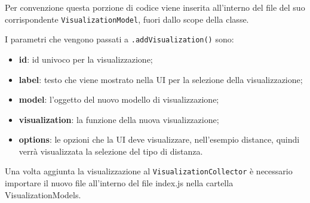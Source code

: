         Per convenzione questa porzione di codice viene inserita all'interno del file del suo corrispondente \texttt{VisualizationModel}, fuori dallo scope della classe.
        
        I parametri che vengono passati a \texttt{.addVisualization()} sono:
        \begin{itemize}
            \item \textbf{id}: id univoco per la visualizzazione;
            \item \textbf{label}: testo che viene mostrato nella UI per la selezione della visualizzazione;
            \item \textbf{model}: l'oggetto del nuovo modello di visualizzazione;
            \item \textbf{visualization}: la funzione della nuova visualizzazione;
            \item \textbf{options}: le opzioni che la UI deve visualizzare, nell'esempio distance, quindi verrà visualizzata la selezione del tipo di distanza.
        \end{itemize}
    
        Una volta aggiunta la visualizzazione al \texttt{VisualizationCollector} è necessario importare il nuovo file all'interno del file index.js nella cartella VisualizationModels.
        
